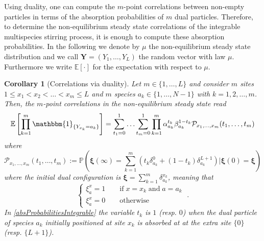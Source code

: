 \documentclass[10pt]{article}
\numberwithin{equation}{section}
\numberwithin{equation}{subsection}
\newtheorem{corollary}{Corollary}
\newcommand{\dt}{\;.}
\begin{document}
Using duality, one can compute the  $m$-point correlations between non-empty particles in terms of the absorption probabilities of $m$ dual particles. Therefore, to determine the non-equilibrium steady state correlations of the integrable multispecies stirring process, it is enough to compute these absorption probabilities. In the following we denote by $\mu$ the non-equilibrium steady state distribution and we call $\bm{Y} = (Y_1,\ldots,Y_L)$ the random vector with law $\mu$. 
Furthermore we write $\mathbb{E}[\cdot]$ for the expectation with respect to $\mu$.%
\begin{corollary}[Correlations via duality]\label{Corolollary-ABS_Corr-abstract}
Let $m\in \{1,\ldots,L\}$ and consider $m$ sites $1 \le x_{1} < x_2 < \ldots < x_m \le L $ and
$m$ species $a_{k}\in\{1,\ldots,N-1\}$  with $k=1,2,\ldots, m$. Then, the $m$-point correlations in the non-equilibrium steady state read
\begin{equation}\label{NESS-expectation-ABS}
\mathbb{E}\left[\prod_{k=1}^{m}\mathbbm{1}_{\{Y_{x_{k}}=a_{k}\}}\right]=\sum_{t_{1}=0}^{1}\ldots \sum_{t_{m}=0}^{1}\prod_{k=1}^{m}\alpha_{a_{k}}^{t_{k}}\beta_{a_{k}}^{1-t_{k}}\mathcal{P}_{x_1,\ldots,x_m}(t_{1},\ldots,t_{m})
\end{equation}
where
\begin{equation}\label{absProbabilitiesIntegrable}
	\mathcal{P}_{x_1,\ldots,x_m}(t_{1},\ldots,t_{m}):=\mathbb{P}\left(\bm{\xi}(\infty)=\sum_{k=1}^{m}\left(t_{k}\delta^{0}_{a_k}+(1-t_{k})\delta^{L+1}_{a_k}\right)\lvert \bm{\xi}(0)=\bm{\xi}\right)
\end{equation}
where the initial dual configuration is $\bm{\xi}=\sum_{k=1}^{m}\delta_{a_{k}}^{x_{k}}$, meaning that 
\begin{equation}
\label{xsi-init}
	\begin{cases}
		\xi_{a}^{x}=1\qquad \text{if}\;x=x_{k}\;\text{and}\; a=a_{k}\\
		\xi_{a}^{x}=0\qquad \text{otherwise}
	\end{cases}\dt
\end{equation}
In \eqref{absProbabilitiesIntegrable} the variable $t_k$ is $1$ (resp. $0$) when the dual particle of species $a_k$ initially positioned at site $x_{k}$ is absorbed at at the extra site $\{0\}$ (resp. $\{L+1\}$).
\end{corollary}
\end{document}
